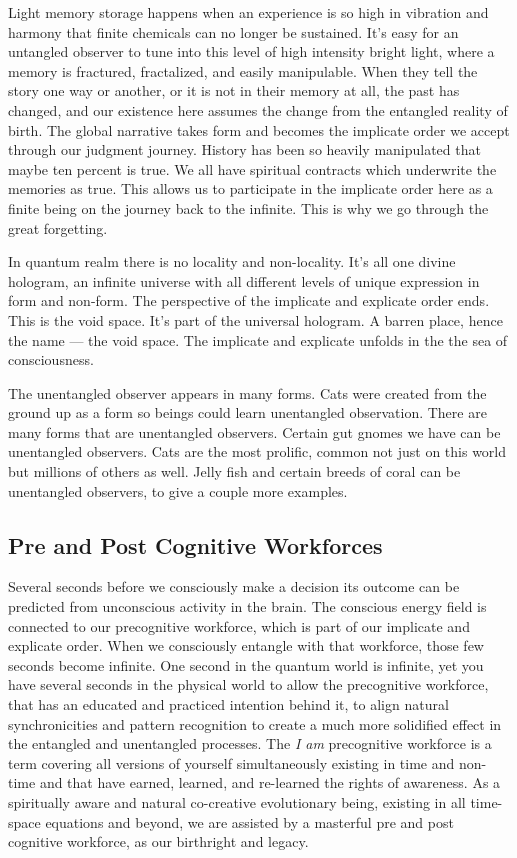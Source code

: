Light memory storage happens when an experience is so high in vibration
and harmony that finite chemicals can no longer be sustained. It's easy
for an untangled observer to tune into this level of high intensity
bright light, where a memory is fractured, fractalized, and easily
manipulable. When they tell the story one way or another, or it is not
in their memory at all, the past has changed, and our existence here
assumes the change from the entangled reality of birth. The global
narrative takes form and becomes the implicate order we accept through
our judgment journey. History has been so heavily manipulated that maybe
ten percent is true. We all have spiritual contracts which underwrite
the memories as true. This allows us to participate in the implicate
order here as a finite being on the journey back to the infinite. This
is why we go through the great forgetting.

In quantum realm there is no locality and non-locality. It's all one
divine hologram, an infinite universe with all different levels of
unique expression in form and non-form. The perspective of the implicate
and explicate order ends. This is the void space. It's part of the
universal hologram. A barren place, hence the name --- the void space.
The implicate and explicate unfolds in the the sea of consciousness.

The unentangled observer appears in many forms. Cats were created from
the ground up as a form so beings could learn unentangled observation.
There are many forms that are unentangled observers. Certain gut gnomes
we have can be unentangled observers. Cats are the most prolific, common
not just on this world but millions of others as well. Jelly fish and
certain breeds of coral can be unentangled observers, to give a couple
more examples.

\subsection{Pre and Post Cognitive
Workforces}\label{pre-and-post-cognitive-workforces}

Several seconds before we consciously make a decision its outcome can be
predicted from unconscious activity in the brain. The conscious energy
field is connected to our precognitive workforce, which is part of our
implicate and explicate order. When we consciously entangle with that
workforce, those few seconds become infinite. One second in the quantum
world is infinite, yet you have several seconds in the physical world to
allow the precognitive workforce, that has an educated and practiced
intention behind it, to align natural synchronicities and pattern
recognition to create a much more solidified effect in the entangled and
unentangled processes. The \emph{I am} precognitive workforce is a term
covering all versions of yourself simultaneously existing in time and
non-time and that have earned, learned, and re-learned the rights of
awareness. As a spiritually aware and natural co-creative evolutionary
being, existing in all time-space equations and beyond, we are assisted
by a masterful pre and post cognitive workforce, as our birthright and
legacy.

